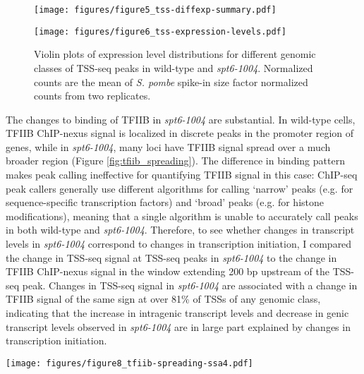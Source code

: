 \documentclass[11pt, letterpaper]{article}
\begin{document}
\begin{figure}[h]
    \centering
    \begin{minipage}[t]{8.5cm}
        \centering
        \texttt{[image: figures/figure5\_tss-diffexp-summary.pdf]}
        \caption{Top) Diagram of different genomic classes of TSSs. Bottom) Bar plot showing the number of TSS-seq peaks differentially expressed in \textit{spt6-1004} versus wild-type.}
        \label{fig:tss_diffexp_summary}
    \end{minipage}\hfill
    \begin{minipage}[t]{8.5cm}
        \centering
        \texttt{[image: figures/figure6\_tss-expression-levels.pdf]}
        \caption{Violin plots of expression level distributions for different genomic classes of TSS-seq peaks in wild-type and \textit{spt6-1004}. Normalized counts are the mean of \textit{S. pombe} spike-in size factor normalized counts from two replicates.}
        \label{fig:tss_expression_levels}
    \end{minipage}
\end{figure}

The changes to binding of TFIIB in \textit{spt6-1004} are substantial. In wild-type cells, TFIIB ChIP-nexus signal is localized in discrete peaks in the promoter region of genes, while in \textit{spt6-1004}, many loci have TFIIB signal spread over a much broader region (Figure \ref{fig:tfiib_spreading}). The difference in binding pattern makes peak calling ineffective for quantifying TFIIB signal in this case: ChIP-seq peak callers generally use different algorithms for calling `narrow' peaks (e.g. for sequence-specific transcription factors) and `broad' peaks (e.g. for histone modifications), meaning that a single algorithm is unable to accurately call peaks in both wild-type and \textit{spt6-1004}. Therefore, to see whether changes in transcript levels in \textit{spt6-1004} correspond to changes in transcription initiation, I compared the change in TSS-seq signal at TSS-seq peaks in \textit{spt6-1004} to the change in TFIIB ChIP-nexus signal in the window extending 200 bp upstream of the TSS-seq peak. Changes in TSS-seq signal in \textit{spt6-1004} are associated with a change in TFIIB signal of the same sign at over 81\% of TSSs of any genomic class, indicating that the increase in intragenic transcript levels and decrease in genic transcript levels observed in \textit{spt6-1004} are in large part explained by changes in transcription initiation.

\begin{SCfigure}[50][h]
\centering
\texttt{[image: figures/figure8\_tfiib-spreading-ssa4.pdf]}
\caption{Top) TFIIB ChIP-nexus protection in wild-type and \textit{spt6-1004} strains over 20 kb of chromosome II flanking the \textit{SSA4} gene. Bottom) Expanded view of TFIIB protection over the \textit{SSA4} gene.}
\label{fig:tfiib_spreading}
\end{SCfigure}
\end{document}
